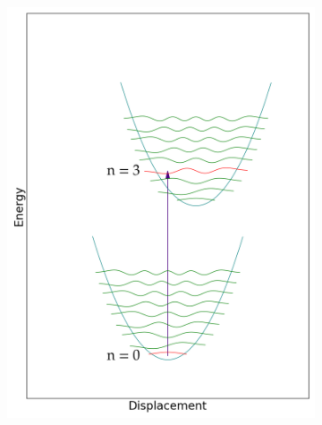 \documentclass[12pt, fleqn]{beamer}
\begin{document}
\begin{frame}
\begin{overlayarea}{\textwidth}{14cm}
{\begin{figure}[h!]
\begin{subfigure}[b]{0.45\linewidth}
                    \includegraphics[width=\linewidth]{fc/tr_3.png}
                \end{subfigure}
                \begin{subfigure}[b]{0.45\linewidth}

\end{subfigure}
\end{figure}}
\end{overlayarea}
\end{frame}
\end{document}
